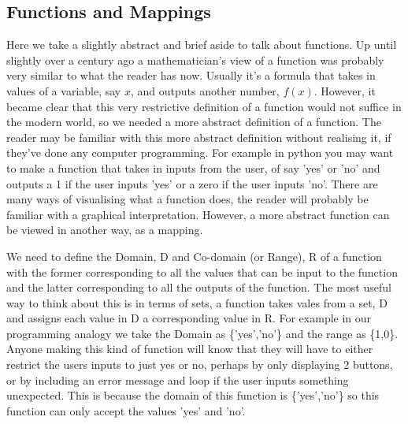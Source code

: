 \subsection{Functions and Mappings}
Here we take a slightly abstract and brief aside to talk about functions. 
Up until slightly over a century ago a mathematician's view of a function was probably very similar to what the reader has now. Usually it's a formula that takes in values of a variable, say $x$, and outputs another number, $f(x)$. However, it became clear that this very restrictive definition of a function would not suffice in the modern world, so we needed a more abstract definition of a function.
 The reader may be familiar with this more abstract definition without realising it, if they've done any computer programming.
  For example in python you may want to make a function that takes in inputs from the user, of say 'yes' or 'no' and outputs a 1 if the user inputs 'yes' or a zero if the user inputs 'no'.
   There are many ways of visualising what a function does, the reader will probably be familiar with a graphical interpretation.
    However, a more abstract function can be viewed in another way, as a mapping. 
    
We need to define the Domain, D and Co-domain (or Range), R of a function with the former corresponding to all the values that can be input to the function and the latter corresponding to all the outputs of the function.
The most useful way to think about this is in terms of sets, a function takes vales from a set, D and assigns each value in D a corresponding value in R.
For example in our programming analogy we take the Domain as \{'yes','no'\} and the range as \{1,0\}. 
Anyone making this kind of function will know that they will have to either restrict the users inputs to just yes or no, perhaps by only displaying 2 buttons, or by including an error message and loop if the user inputs something unexpected.
This is because the domain of this function is \{'yes','no'\} so this function can only accept the values 'yes' and 'no'.


